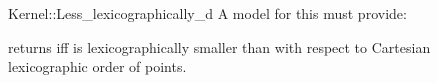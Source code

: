 \begin{ccRefFunctionObjectConcept}{Kernel::Less_lexicographically_d}
A model for this must provide:


{returns  iff  is lexicographically smaller
 than  with respect to Cartesian lexicographic order of points.}

\end{ccRefFunctionObjectConcept}
